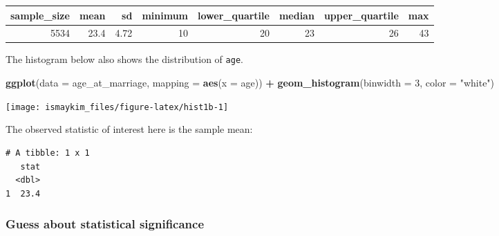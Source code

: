 \documentclass[12pt, krantz2,]{krantz}
\makeatletter
\newenvironment{Shaded}{\begin{snugshade}}{\end{snugshade}}
\newcommand{\DataTypeTok}[1]{\textcolor[rgb]{0.27,0.27,0.27}{#1}}
\newcommand{\DecValTok}[1]{\textcolor[rgb]{0.06,0.06,0.06}{#1}}
\newcommand{\KeywordTok}[1]{\textcolor[rgb]{0.27,0.27,0.27}{\textbf{#1}}}
\newcommand{\NormalTok}[1]{#1}
\newcommand{\OperatorTok}[1]{\textcolor[rgb]{0.43,0.43,0.43}{\textbf{#1}}}
\newcommand{\StringTok}[1]{\textcolor[rgb]{0.5,0.5,0.5}{#1}}
\newenvironment{kframe}{%
\medskip{}
\setlength{\fboxsep}{.8em}
 \def\at@end@of@kframe{}%
 \ifinner\ifhmode%
  \def\at@end@of@kframe{\end{minipage}}%
  \begin{minipage}{\columnwidth}%
 \fi\fi%
 \def\FrameCommand##1{\hskip\@totalleftmargin \hskip-\fboxsep
 \colorbox{shadecolor}{##1}\hskip-\fboxsep
     \hskip-\linewidth \hskip-\@totalleftmargin \hskip\columnwidth}%
 \MakeFramed {\advance\hsize-\width
   \@totalleftmargin\z@ \linewidth\hsize
   \@setminipage}}%
 {\par\unskip\endMakeFramed%
 \at@end@of@kframe}
\renewenvironment{Shaded}{\begin{kframe}}{\end{kframe}}
\makeatother
\begin{document}
\begin{table}[H]
\centering\begingroup\fontsize{10}{12}\selectfont

\begin{tabular}{r|r|r|r|r|r|r|r}
\hline
sample\_size & mean & sd & minimum & lower\_quartile & median & upper\_quartile & max\\
\hline
5534 & 23.4 & 4.72 & 10 & 20 & 23 & 26 & 43\\
\hline
\end{tabular}
\endgroup{}
\end{table}

The histogram below also shows the distribution of \texttt{age}.

\begin{Shaded}
\begin{Highlighting}[]
\KeywordTok{ggplot}\NormalTok{(}\DataTypeTok{data =}\NormalTok{ age_at_marriage, }\DataTypeTok{mapping =} \KeywordTok{aes}\NormalTok{(}\DataTypeTok{x =}\NormalTok{ age)) }\OperatorTok{+}
\StringTok{  }\KeywordTok{geom_histogram}\NormalTok{(}\DataTypeTok{binwidth =} \DecValTok{3}\NormalTok{, }\DataTypeTok{color =} \StringTok{"white"}\NormalTok{)}
\end{Highlighting}
\end{Shaded}

\begin{center}\texttt{[image: ismaykim\_files/figure-latex/hist1b-1]} \end{center}

The observed statistic of interest here is the sample mean:

\begin{Shaded}
\end{Shaded}

\begin{verbatim}
# A tibble: 1 x 1
   stat
  <dbl>
1  23.4
\end{verbatim}

\hypertarget{guess-about-statistical-significance}{%
\subsubsection*{Guess about statistical significance}\label{guess-about-statistical-significance}}
\end{document}
